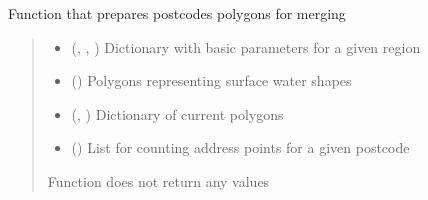 \documentclass[letterpaper,10pt,english]{sphinxmanual}
\begin{document}

\begin{fulllineitems}
\label{\detokenize{pcm_utilities:pcm_utilities.prepare_merging}}
\pysigstartsignatures
{}
\pysigstopsignatures
\sphinxAtStartPar
Function that prepares postcodes polygons for merging
\begin{quote}\begin{description}
\begin{itemize}
\item {} 
\sphinxAtStartPar
{} (\sphinxcode{\sphinxupquote{Dict}}{[}, \sphinxcode{\sphinxupquote{Dict}}{[}, \sphinxcode{\sphinxupquote{Any}}{]}{]}) \textendash{} Dictionary with basic parameters for a given region

\item {} 
\sphinxAtStartPar
{} () \textendash{} Polygons representing surface water shapes

\item {} 
\sphinxAtStartPar
{} (\sphinxcode{\sphinxupquote{Dict}}{[}, \sphinxcode{\sphinxupquote{List}}{[}\sphinxcode{\sphinxupquote{Any}}{]}{]}) \textendash{} Dictionary of current polygons

\item {} 
\sphinxAtStartPar
{} (\sphinxcode{\sphinxupquote{List}}{[}\sphinxcode{\sphinxupquote{int}}{]}) \textendash{} List for counting address points for a given postcode

\end{itemize}

\sphinxAtStartPar
{}

\sphinxAtStartPar
Function does not return any values

\end{description}\end{quote}

\end{fulllineitems}
\end{document}
